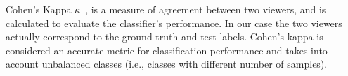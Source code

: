 Cohen's Kappa $\kappa$~\cite{uebersax1987diversity}, is a measure of agreement between two viewers, and is calculated to evaluate the classifier's performance. 
In our case the two viewers actually correspond to the ground truth and test labels. Cohen's kappa is considered an accurate metric for classification performance and takes into account unbalanced classes (i.e., classes with different number of samples). 
